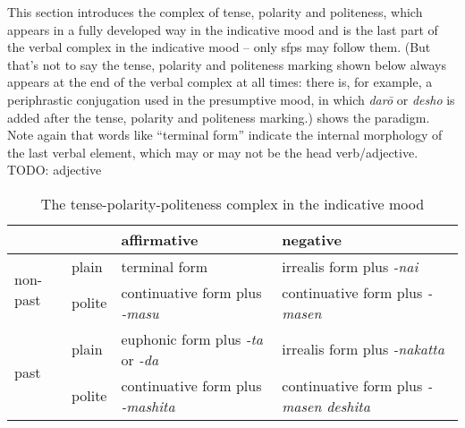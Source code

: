 \documentclass[UTF8, a4paper, oneside, scheme=plain]{ctexrep}
\newcommand{\corpus}[1]{\emph{#1}}
\begin{document}
This section introduces the complex of tense, polarity and politeness,
which appears in a fully developed way in the indicative mood
and is the last part of the verbal complex in the indicative mood
-- only \ac{sfp}s may follow them.
(But that's not to say the tense, polarity and politeness marking shown below
always appears at the end of the verbal complex at all times:
there is, for example, a periphrastic conjugation used in the presumptive mood, 
in which \corpus{dar\={o}} or \corpus{desho} is added after the tense, polarity and politeness marking.)
 shows the paradigm. 
Note again that words like ``terminal form'' indicate the internal morphology 
of the last verbal element, 
which may or may not be the head verb/adjective.
TODO: adjective

\begin{table}[H]
    \caption{The tense-polarity-politeness complex in the indicative mood}
    \label{tbl:tense-polarity-politeness}
    \begin{tabular}{llll}
        \toprule
        &                            & affirmative                                                       & negative                                                          \\
                              \midrule
    \multirow{2}{*}{non-past} & plain                      & terminal form                                                     & irrealis form plus \corpus{-nai}                                   \\
                              & polite                     & continuative form plus \corpus{-masu}                              & continuative form plus \corpus{-masen}                             \\ \midrule
    \multirow{2}{*}{past}     & \multicolumn{1}{l}{plain}  & \multicolumn{1}{l}{euphonic form plus \corpus{-ta} or \corpus{-da}} & \multicolumn{1}{l}{irrealis form plus \corpus{-nakatta}}           \\
                              & \multicolumn{1}{l}{polite} & \multicolumn{1}{l}{continuative form plus \corpus{-mashita}}       & \multicolumn{1}{l}{continuative form plus \corpus{-masen deshita}} \\
                              \bottomrule
    \end{tabular}
\end{table}
\end{document}
